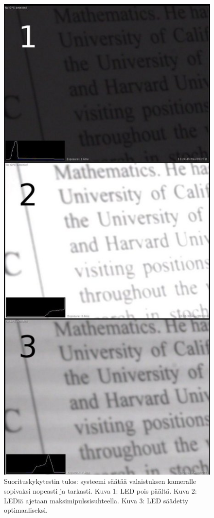 \documentclass[finnish,12pt]{article}
\begin{document}
\begin{figure}[h]
 \begin{center}
  \includegraphics[scale=0.5]{kuvat/tulos.jpg}
  \caption{Suorituskykytestin tulos: systeemi säätää valaistuksen kameralle sopivaksi nopeasti ja tarkasti. Kuva 1: LED pois päältä. Kuva 2: LEDiä ajetaan maksimipulssisuhteella. Kuva 3: LED säädetty optimaaliseksi.}
  \label{fig:tulos}
 \end{center}

\end{figure}
\end{document}
